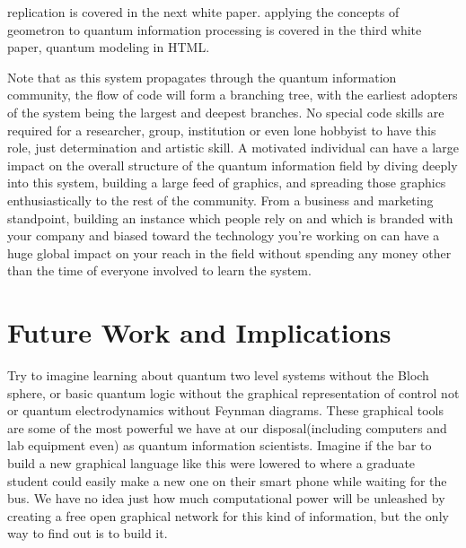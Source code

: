 \documentclass[11pt]{article}
\begin{document}
replication is covered in the next white paper.
applying the concepts of geometron to quantum information processing is covered in the third white paper, quantum modeling in HTML.

Note that as this system propagates through the quantum information community, the flow of code will form a branching tree, with the earliest adopters of the system being the largest and deepest branches.  No special code skills are required for a researcher, group, institution or even lone hobbyist to have this role, just determination and artistic skill.  A motivated individual can have a large impact on the overall structure of the quantum information field by diving deeply into this system, building a large feed of graphics, and spreading those graphics enthusiastically to the rest of the community.  From a business and marketing standpoint, building an instance which people rely on  and which is branded with your company and biased toward the technology you're working on can have a huge global impact on your reach in the field without spending any money other than the time of everyone involved to learn the system.  




\section{Future Work and Implications}

Try to imagine learning about quantum two level systems without the Bloch sphere, or basic quantum logic without the graphical representation of control not or quantum electrodynamics without Feynman diagrams.  These graphical tools are some of the most powerful we have at our disposal(including computers and lab equipment even) as quantum information scientists.  Imagine if the bar to build a new graphical language like this were lowered to where a graduate student could easily make a new one on their smart phone while waiting for the bus.  We have no idea just how much computational power will be unleashed by creating a free open graphical network for this kind of information, but the only way to find out is to build it.  
\end{document}
